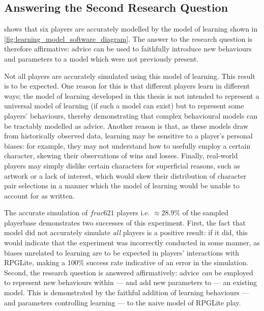 \subsection{Answering the Second Research Question}

shows that six players are accurately modelled by the \aspectoriented model of
learning shown in \cref{fig:learning_model_software_diagram}. The answer to the
research question is therefore affirmative: advice can be used to faithfully
introduce new behaviours and parameters to a model which were not previously
present.

Not all players are accurately simulated using this model of learning. This
result is to be expected. One reason for this is that different players learn in
different ways; the model of learning developed in this thesis is not intended
to represent a universal model of learning (if such a model can exist) but to
represent some players' behaviours, thereby demonstrating that complex
behavioural models can be tractably modelled as advice. Another reason is that,
as these models draw from historically observed data, learning may be sensitive
to a player's personal biases: for example, they may not understand how to
usefully employ a certain character, skewing their observations of wins and
losses. Finally, real-world players may simply dislike certain characters for
superficial reasons, such as artwork or a lack of interest, which would skew
their distribution of character pair selections in a manner which the model of
learning would be unable to account for as written.

The accurate simulation of $frac{6}{21}$ players i.e. $\approx{}28.9\%$ of the
sampled playerbase demonstrates two successes of this experiment. First, the
fact that model did not accurately simulate \emph{all} players is a positive
result: if it did, this would indicate that the experiment was incorrectly
conducted in some manner, as biases unrelated to learning are to be expected in
players' interactions with RPGLite, making a 100\% success rate indicative of an
error in the simulation. Second, the research question is answered
affirmatively: advice \emph{can} be employed to represent new behaviours within
--- and add new parameters to --- an existing model. This is demonstrated by the
faithful addition of \aspectoriented learning behaviours --- and parameters
controlling learning --- to the naive model of RPGLite play.

